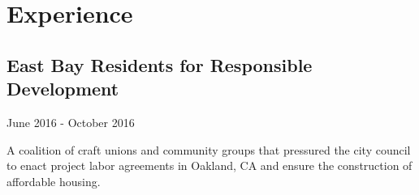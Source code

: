 \documentclass[
]{article}
\begin{document}
\section{Experience}

\hypertarget{east-bay-residents-for-responsible-development}{%
\subsection{East Bay Residents for Responsible
Development}\label{east-bay-residents-for-responsible-development}}

June 2016 - October 2016

A coalition of craft unions and community groups that pressured the city
council to enact project labor agreements in Oakland, CA and ensure the
construction of affordable housing.
\end{document}
